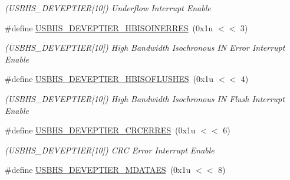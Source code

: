 \begin{DoxyCompactItemize}
\begin{DoxyCompactList}\small\item\em (U\+S\+B\+H\+S\+\_\+\+D\+E\+V\+E\+P\+T\+I\+ER\mbox{[}10\mbox{]}) Underflow Interrupt Enable \end{DoxyCompactList}\item 
\mbox{\label{group__SAMS70__USBHS_ga621edff4072d689f694edf11a284f770}} 
\#define \mbox{\hyperlink{group__SAMS70__USBHS_ga621edff4072d689f694edf11a284f770}{U\+S\+B\+H\+S\+\_\+\+D\+E\+V\+E\+P\+T\+I\+E\+R\+\_\+\+H\+B\+I\+S\+O\+I\+N\+E\+R\+R\+ES}}~(0x1u $<$$<$ 3)
\begin{DoxyCompactList}\small\item\em (U\+S\+B\+H\+S\+\_\+\+D\+E\+V\+E\+P\+T\+I\+ER\mbox{[}10\mbox{]}) High Bandwidth Isochronous IN Error Interrupt Enable \end{DoxyCompactList}\item 
\mbox{\label{group__SAMS70__USBHS_ga4ac4802b3713504a790b8f10c62f1a89}} 
\#define \mbox{\hyperlink{group__SAMS70__USBHS_ga4ac4802b3713504a790b8f10c62f1a89}{U\+S\+B\+H\+S\+\_\+\+D\+E\+V\+E\+P\+T\+I\+E\+R\+\_\+\+H\+B\+I\+S\+O\+F\+L\+U\+S\+H\+ES}}~(0x1u $<$$<$ 4)
\begin{DoxyCompactList}\small\item\em (U\+S\+B\+H\+S\+\_\+\+D\+E\+V\+E\+P\+T\+I\+ER\mbox{[}10\mbox{]}) High Bandwidth Isochronous IN Flush Interrupt Enable \end{DoxyCompactList}\item 
\mbox{\label{group__SAMS70__USBHS_ga07e37d9a679da1fba5def79ccf2a498e}} 
\#define \mbox{\hyperlink{group__SAMS70__USBHS_ga07e37d9a679da1fba5def79ccf2a498e}{U\+S\+B\+H\+S\+\_\+\+D\+E\+V\+E\+P\+T\+I\+E\+R\+\_\+\+C\+R\+C\+E\+R\+R\+ES}}~(0x1u $<$$<$ 6)
\begin{DoxyCompactList}\small\item\em (U\+S\+B\+H\+S\+\_\+\+D\+E\+V\+E\+P\+T\+I\+ER\mbox{[}10\mbox{]}) C\+RC Error Interrupt Enable \end{DoxyCompactList}\item 
\mbox{\label{group__SAMS70__USBHS_ga4fbb7b3cdc6a6fd2701ace359856cee9}} 
\#define \mbox{\hyperlink{group__SAMS70__USBHS_ga4fbb7b3cdc6a6fd2701ace359856cee9}{U\+S\+B\+H\+S\+\_\+\+D\+E\+V\+E\+P\+T\+I\+E\+R\+\_\+\+M\+D\+A\+T\+A\+ES}}~(0x1u $<$$<$ 8)

\end{DoxyCompactItemize}
